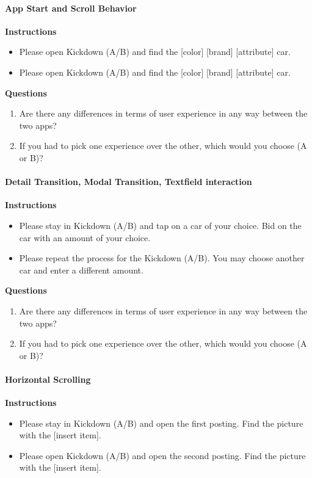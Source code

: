 \paragraph*{App Start and Scroll Behavior}\hfill \break
\textbf{Instructions}
\begin{itemize}
    \item Please open Kickdown (A/B) and find the [color] [brand] [attribute] car.
    \item Please open Kickdown (A/B) and find the [color] [brand] [attribute] car.
\end{itemize}

\textbf{Questions}
\begin{enumerate}
    \item Are there any differences in terms of user experience in any way between the two apps?
    \item If you had to pick one experience over the other, which would you choose (A or B)?
\end{enumerate}

\paragraph*{Detail Transition, Modal Transition, Textfield interaction}\hfill \break
\textbf{Instructions}
\begin{itemize}
    \item Please stay in Kickdown (A/B) and tap on a car of your choice. Bid on the car with an amount of your choice.
    \item Please repeat the process for the Kickdown (A/B). You may choose another car and enter a different amount.
\end{itemize}

\textbf{Questions}
\begin{enumerate}
    \item Are there any differences in terms of user experience in any way between the two apps?
    \item If you had to pick one experience over the other, which would you choose (A or B)?
\end{enumerate}


\paragraph*{Horizontal Scrolling}\hfill \break
\textbf{Instructions}
\begin{itemize}
    \item Please stay in Kickdown (A/B) and open the first posting. Find the picture with the [insert item].
    \item Please open Kickdown (A/B) and open the second posting. Find the picture with the [insert item].
\end{itemize}

